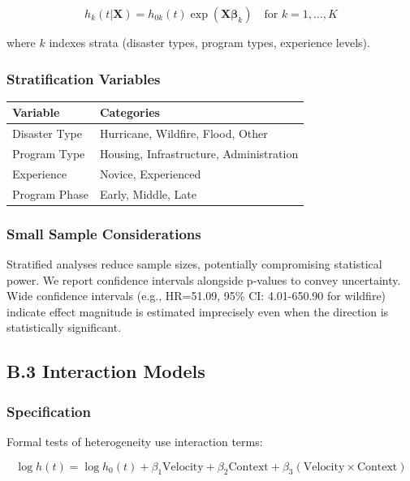 \documentclass[
  12pt,
  letterpaper,
]{article}
\begin{document}
\[
h_k(t | \mathbf{X}) = h_{0k}(t) \exp(\mathbf{X}\boldsymbol{\beta}_k) \quad \text{for } k = 1, \ldots, K
\]

where \(k\) indexes strata (disaster types, program types, experience
levels).

\subsubsection{Stratification Variables}\label{stratification-variables}

\begin{longtable}[]{@{}ll@{}}
\toprule\noalign{}
Variable & Categories \\
\midrule\noalign{}
\endhead
\bottomrule\noalign{}
\endlastfoot
Disaster Type & Hurricane, Wildfire, Flood, Other \\
Program Type & Housing, Infrastructure, Administration \\
Experience & Novice, Experienced \\
Program Phase & Early, Middle, Late \\
\end{longtable}

\subsubsection{Small Sample
Considerations}\label{small-sample-considerations}

Stratified analyses reduce sample sizes, potentially compromising
statistical power. We report confidence intervals alongside p-values to
convey uncertainty. Wide confidence intervals (e.g., HR=51.09, 95\% CI:
4.01-650.90 for wildfire) indicate effect magnitude is estimated
imprecisely even when the direction is statistically significant.

\subsection{B.3 Interaction Models}\label{b.3-interaction-models}

\subsubsection{Specification}\label{specification}

Formal tests of heterogeneity use interaction terms:

\[
\log h(t) = \log h_0(t) + \beta_1 \text{Velocity} + \beta_2 \text{Context} + \beta_3 (\text{Velocity} \times \text{Context})
\]
\end{document}
